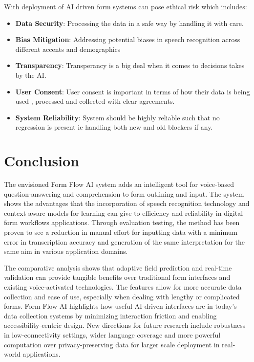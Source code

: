\documentclass[conference]{IEEEtran}
\begin{document}
With deployment of AI driven form systems can pose ethical risk which includes:

\begin{itemize}
\item \textbf{Data Security}: Processing the data in a safe way by handling it with care.
\item \textbf{Bias Mitigation}: Addressing potential biases in speech recognition across different accents and demographics
\item \textbf{Transparency}: Transperancy is a big deal when it comes to decisions takes by the AI.
\item \textbf{User Consent}: User consent is important in terms of how their data is being used , processed and collected with clear agreements.
\item \textbf{System Reliability}: System should be highly reliable such that no regression is present ie handling both new and old blockers if any.
\end{itemize}

\section{Conclusion}

The envisioned Form Flow AI system adds an intelligent tool for voice-based question-answering and comprehension to form outlining and input. The system shows the advantages that the incorporation of speech recognition technology and context aware models for learning can give to efficiency and reliability in digital form workflows applications. Through evaluation testing, the method has been proven to see a reduction in manual effort for inputting data with a minimum error in transcription accuracy and generation of the same interpretation for the same aim in various application domains.

The comparative analysis shows that adaptive field prediction and real-time validation can provide tangible benefits over traditional form interfaces and existing voice-activated technologies. The features allow for more accurate data collection and ease of use, especially when dealing with lengthy or complicated forms. Form Flow AI highlights how useful AI-driven interfaces are in today's data collection systems by minimizing interaction friction and enabling accessibility-centric design. New directions for future research include robustness in low-connectivity settings, wider language coverage and more powerful computation over privacy-preserving data for larger scale deployment in real-world applications.
\end{document}
